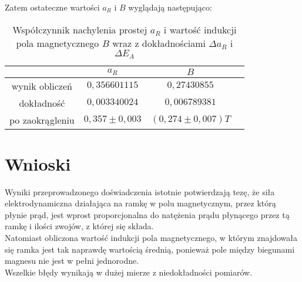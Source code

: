 \documentclass[10pt,a4paper]{article}
\newcommand{\forceindent}{\leavevmode{\parindent=3em\indent}}
\begin{document}
\forceindent Zatem ostateczne wartości $a_R$ i $B$ wyglądają następująco:

\begin{table}[!h]
\centering
\begin{tabular}{|cc||c|c|}
\multicolumn{1}{c}{} & \multicolumn{1}{c}{$a_R$} & \multicolumn{1}{c}{$B$}\\
\hline
wynik obliczeń & $0,356601115$ & $0,27430855$ \\
\hline
dokładność & $0,003340024$ & $0,006789381$\\
\hline
po zaokrągleniu & $0,357 \pm 0,003$  & $(0,274 \pm 0,007) T $\\
\hline
\end{tabular}
\caption{Współczynnik nachylenia prostej $a_R$ i wartość indukcji pola magnetycznego $B$ wraz z dokładnościami $\Delta a_R$ i $\Delta E_A$}
\end{table}

\section*{Wnioski}
\forceindent Wyniki przeprowadzonego doświadczenia istotnie potwierdzają tezę, że siła elektrodynamiczna działająca na ramkę w polu magnetycznym, przez którą płynie prąd, jest wprost proporcjonalna do natężenia prądu płynącego przez tą ramkę i ilości zwojów, z której się składa.  \\
\forceindent Natomiast obliczona wartość indukcji pola magnetycznego, w którym znajdowała się ramka jest tak naprawdę wartością średnią, ponieważ pole między biegunami magnesu nie jest w pełni jednorodne. \\
\forceindent Wszelkie błędy wynikają w dużej mierze z niedokładności pomiarów.
\end{document}

